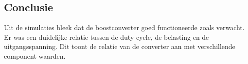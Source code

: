 \subsection{Conclusie}

Uit de simulaties bleek dat de boostconverter goed functioneerde zoals verwacht. Er was een duidelijke relatie tussen de duty cycle, de belasting en de uitgangsspanning. Dit toont de relatie van de converter aan met verschillende component waarden.
